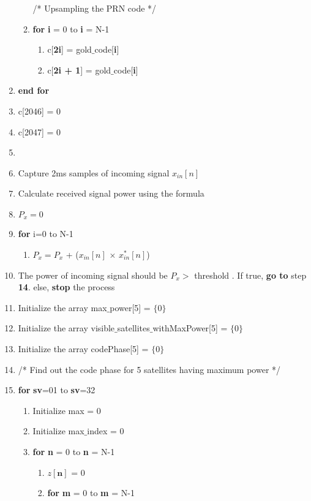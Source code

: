 \documentclass[journal,10pt,onecolumn]{article}
\begin{document}
\begin{enumerate}
\begin{enumerate}
    /* Upsampling the PRN code */
        \item[] \textbf{for} \textbf{i} = 0 to \textbf{i} = N-1
        \begin{enumerate}
            \item[] c[\textbf{2i}] = gold$\_$code[\textbf{i}]
            \item[] c[\textbf{2i + 1}] = gold$\_$code[\textbf{i}]
        \end{enumerate}
        
    \end{enumerate}
    \item[] \textbf{end for}
    \item[] c[2046] = 0
    \item[] c[2047] = 0
    \item[] \item Capture 2ms samples of incoming signal $x_{in}[n]$
    \item Calculate received signal power using the formula
    \item[] $P_x=0$
    \item[] \textbf{for} i=0 to N-1
    \begin{enumerate}
        \item[] $P_x= P_x$ + ($x_{in}[n]$ $\times$ $x^*_{in}[n]$)
    \end{enumerate} 
    \item The power of incoming signal should be $P_x$$>$ threshold . If true, \textbf{go to} step \textbf{14}. else, \textbf{stop} the process
    \item Initialize the array max$\_$power[5] = $\{0\}$
    \item Initialize the array visible$\_$satellites$\_$withMaxPower[5] = $\{0\}$
    \item Initialize the array codePhase[5] = $\{0\}$
    \item [] /* Find out the code phase for 5 satellites having maximum power */ 
    \item \textbf{for} \textbf{sv}=01 to \textbf{sv}=32
    
    \begin{enumerate}
        \item[] Initialize max = 0
        \item[] Initialize max$\_$index = 0
        \item[] \textbf{for} \textbf{n} = 0 to \textbf{n} = N-1
        
        \begin{enumerate}
            \item[] $z[\textbf{n}]$ = 0
            \item[]  \textbf{for} \textbf{m} = 0 to \textbf{m} = N-1
            

\end{enumerate}
\end{enumerate}
\end{enumerate}
\end{document}
